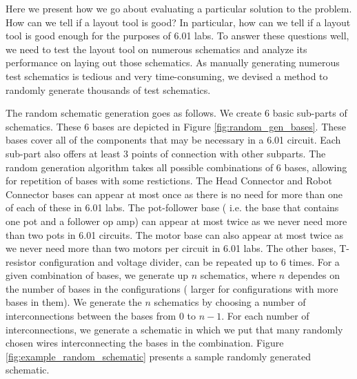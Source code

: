 Here we present how we go about evaluating a particular solution to the problem.
How can we tell if a layout tool is good? In particular, how can we tell if a
layout tool is good enough for the purposes of 6.01 labs. To answer these
questions well, we need to test the layout tool on numerous schematics and
analyze its performance on laying out those schematics. As manually generating
numerous test schematics is tedious and very time-consuming, we devised a method
to randomly generate thousands of test schematics.

The random schematic generation goes as follows. We create $6$ basic sub-parts
of schematics. These $6$ bases are depicted in Figure
\ref{fig:random_gen_bases}. These bases cover all of the components that may be
necessary in a 6.01 circuit. Each sub-part also offers at least $3$ points of
connection with other subparts. The random generation algorithm takes all
possible combinations of
$6$ bases, allowing for repetition of bases with some restictions.
The Head Connector and Robot Connector bases can appear at most once as there is
no need for more than one of each of these in 6.01 labs. The pot-follower base (
i.e. the base that contains one pot and a follower op amp) can appear at most
twice as we never need more than two pots in 6.01 circuits. The motor base can
also appear at most twice as we never need more than two motors per circuit in
6.01 labs. The other bases, T-resistor configuration and voltage divider, can be
repeated up to 6 times. For a given combination of bases, we generate up $n$
schematics, where $n$ dependes on the number of bases in the configurations (
larger for configurations with more bases in them).
We generate the $n$ schematics by choosing a number of interconnections between
the bases from $0$ to $n-1$. For each number of interconnections, we generate
a schematic in which we put that many randomly chosen wires interconnecting
the bases in the combination. Figure \ref{fig:example_random_schematic} presents
a sample randomly generated schematic.

